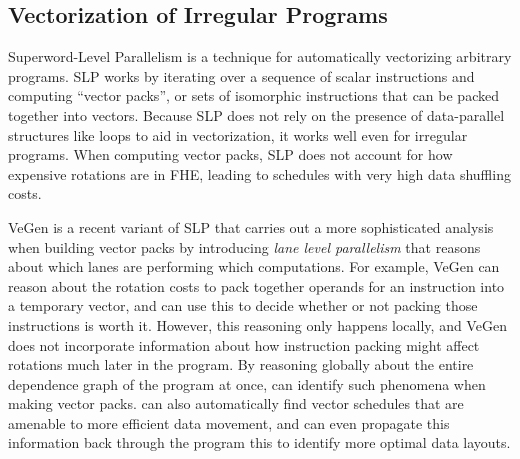 \subsection{Vectorization of Irregular Programs}
Superword-Level Parallelism \cite{SLP} is a technique for automatically vectorizing arbitrary programs.
SLP works by iterating over a sequence of scalar instructions and computing ``vector packs'', or sets of isomorphic instructions that can be packed together into vectors.
Because SLP does not rely on the presence of data-parallel structures like loops to aid in vectorization, it works well even for irregular programs.
When computing vector packs, SLP does not account for how expensive rotations are in FHE, leading to schedules with very high data shuffling costs. 

VeGen \cite{VeGen} is a recent variant of SLP that carries out a more sophisticated analysis when building vector packs by introducing {\em lane level parallelism} that reasons about which lanes are performing which computations.
For example, VeGen can reason about the rotation costs to pack together operands for an instruction into a temporary vector, and can use this to decide whether or not packing those instructions is worth it.
However, this reasoning only happens locally, and VeGen does not incorporate information about how instruction packing might affect rotations much later in the program.
By reasoning globally about the entire dependence graph of the program at once, \system can identify such phenomena when making vector packs.
\system can also automatically find vector schedules that are amenable to more efficient data movement, and can even propagate this information back through the program this to identify more optimal data layouts.

